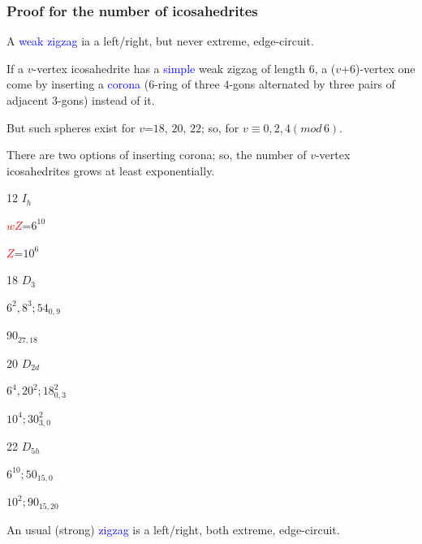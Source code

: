 \documentclass{beamer}
\begin{document}
\begin{frame}\frametitle{Proof for the number of icosahedrites}
\vspace{-3mm}
A \textcolor{blue}{weak zigzag} ia a left/right, but never extreme, 
edge-circuit. 

If a $v$-vertex icosahedrite has a \textcolor{blue}{simple} weak 
zigzag of  length $6$, a 
($v$+$6$)-vertex one come 
by inserting  a  \textcolor{blue}{corona} ($6$-ring of three $4$-gons 
alternated    
by three pairs of adjacent $3$-gons) instead of it.

 But such spheres exist for $v$=$18$, $20$, $22$; so, for  $v$$\equiv$$ 
0,2,4(mod\,6)$. 

There are two options
of inserting corona; so, the number of $v$-vertex icosahedrites grows
at least exponentially.
\begin{center}
\begin{minipage}[b]{22mm}
\centering
{}\par
 12
$I_{h}$\par
\textcolor{red}{$wZ$}=$6^{10}$\par
\textcolor{red}{$Z$}=$10^{6}$
\end{minipage}
\begin{minipage}[b]{22mm}
\centering
{}\par
 18 $D_{3}$\par
$6^{2},8^3;54_{0,9}$\par
$90_{27,18}$
\end{minipage}
\begin{minipage}[b]{22mm}
\centering
{}\par
20 $D_{2d}$\par
$6^{4},20^2;18_{0,3}^2$\par
$10^4;30_{3,0}^2$
\end{minipage}
\begin{minipage}[b]{22mm}\centering
{}\par
22 $D_{5h}$\par
$6^{10};50_{15,0}$\par
$10^2;90_{15,20}$
\end{minipage}
\end{center}  
An usual (strong) \textcolor{blue}{zigzag}  is a 
left/right, both extreme, edge-circuit. 

\end{frame}
\end{document}
